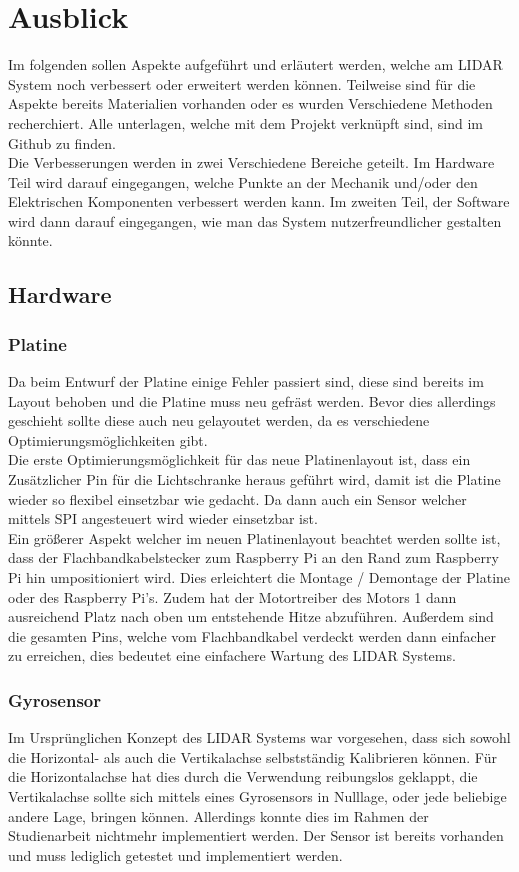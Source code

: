 \chapter{Ausblick}
Im folgenden sollen Aspekte aufgeführt und erläutert werden, welche am \ac{LIDAR} System noch verbessert oder erweitert werden können. Teilweise sind für die Aspekte bereits Materialien vorhanden oder es wurden Verschiedene Methoden recherchiert. Alle unterlagen, welche mit dem Projekt verknüpft sind, sind im Github zu finden.\\
Die Verbesserungen werden in zwei Verschiedene Bereiche geteilt. Im Hardware Teil wird darauf eingegangen, welche Punkte an der Mechanik und/oder den Elektrischen Komponenten verbessert werden kann. Im zweiten Teil, der Software wird dann darauf eingegangen, wie man das System nutzerfreundlicher gestalten könnte.  
\section{Hardware}
\subsection{Platine}
Da beim Entwurf der Platine einige Fehler passiert sind, diese sind bereits im Layout behoben und die Platine muss neu gefräst werden. Bevor dies allerdings geschieht sollte diese auch neu gelayoutet werden, da es verschiedene Optimierungsmöglichkeiten gibt. \\
Die erste Optimierungsmöglichkeit für das neue Platinenlayout ist, dass ein Zusätzlicher Pin für die Lichtschranke heraus geführt wird, damit ist die Platine wieder so flexibel einsetzbar wie gedacht. Da dann auch ein Sensor welcher mittels \ac{SPI} angesteuert wird wieder einsetzbar ist.\\
Ein größerer Aspekt welcher im neuen Platinenlayout beachtet werden sollte ist, dass der Flachbandkabelstecker zum Raspberry Pi an den Rand zum Raspberry Pi hin umpositioniert wird. Dies erleichtert die Montage / Demontage der Platine oder des Raspberry Pi's. Zudem hat der Motortreiber des Motors 1 dann ausreichend Platz nach oben um entstehende Hitze abzuführen. Außerdem sind die gesamten Pins, welche vom Flachbandkabel verdeckt werden dann einfacher zu erreichen, dies bedeutet eine einfachere Wartung des \ac{LIDAR} Systems.
\subsection{Gyrosensor}
Im Ursprünglichen Konzept des \ac{LIDAR} Systems war vorgesehen, dass sich sowohl die Horizontal- als auch die Vertikalachse selbstständig Kalibrieren können. Für die Horizontalachse hat dies durch die Verwendung reibungslos geklappt, die Vertikalachse sollte sich mittels eines Gyrosensors in Nulllage, oder jede beliebige andere Lage, bringen können. Allerdings konnte dies im Rahmen der Studienarbeit nichtmehr implementiert werden. Der Sensor  ist bereits vorhanden und muss lediglich getestet und implementiert werden.
